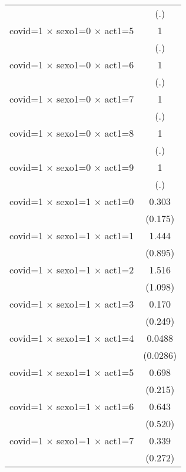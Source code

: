 {\begin{tabular}{l*{1}{c}}
                    &         (.)         \\
[1em]
covid=1 $\times$ sexo1=0 $\times$ act1=5&           1         \\
                    &         (.)         \\
[1em]
covid=1 $\times$ sexo1=0 $\times$ act1=6&           1         \\
                    &         (.)         \\
[1em]
covid=1 $\times$ sexo1=0 $\times$ act1=7&           1         \\
                    &         (.)         \\
[1em]
covid=1 $\times$ sexo1=0 $\times$ act1=8&           1         \\
                    &         (.)         \\
[1em]
covid=1 $\times$ sexo1=0 $\times$ act1=9&           1         \\
                    &         (.)         \\
[1em]
covid=1 $\times$ sexo1=1 $\times$ act1=0&       0.303\sym{*}  \\
                    &     (0.175)         \\
[1em]
covid=1 $\times$ sexo1=1 $\times$ act1=1&       1.444         \\
                    &     (0.895)         \\
[1em]
covid=1 $\times$ sexo1=1 $\times$ act1=2&       1.516         \\
                    &     (1.098)         \\
[1em]
covid=1 $\times$ sexo1=1 $\times$ act1=3&       0.170         \\
                    &     (0.249)         \\
[1em]
covid=1 $\times$ sexo1=1 $\times$ act1=4&      0.0488\sym{***}\\
                    &    (0.0286)         \\
[1em]
covid=1 $\times$ sexo1=1 $\times$ act1=5&       0.698         \\
                    &     (0.215)         \\
[1em]
covid=1 $\times$ sexo1=1 $\times$ act1=6&       0.643         \\
                    &     (0.520)         \\
[1em]
covid=1 $\times$ sexo1=1 $\times$ act1=7&       0.339         \\
                    &     (0.272)         \\

\end{tabular}}
